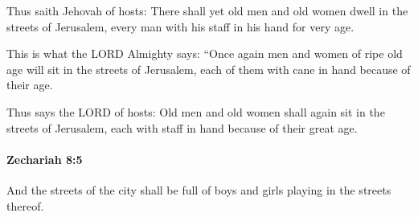 			\begin{versebox}
					\item[BHS] 
					\item[LXX] 
					\item[ASV] Thus saith Jehovah of hosts: There shall yet old men and old women dwell in the streets of Jerusalem, every man with his staff in his hand for very age.
					\item[NIV] This is what the LORD Almighty says: “Once again men and women of ripe old age will sit in the streets of Jerusalem, each of them with cane in hand because of their age.
					\item[NRSV] Thus says the LORD of hosts: Old men and old women shall again sit in the streets of Jerusalem, each with staff in hand because of their great age.
			\end{versebox}

		\paragraph{Zechariah 8:5} %
			\label{ZECHARIAH-8-5}

			And the streets of the city shall be full of boys and girls playing in the streets thereof.

